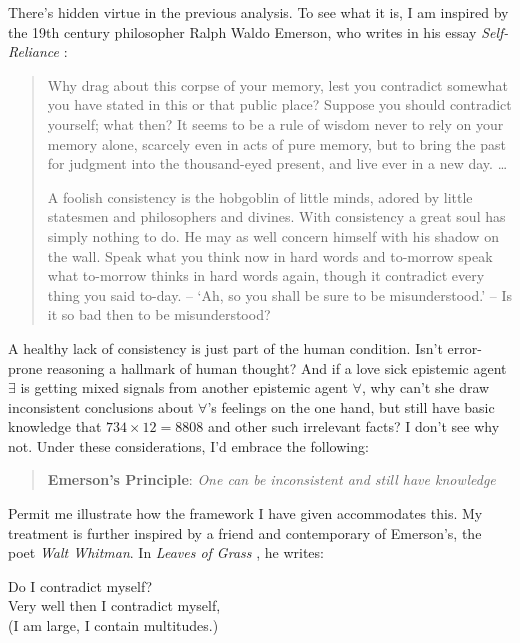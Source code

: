 \documentclass[11pt]{article}
\numberwithin{equation}{subsection}
\begin{document}
There's hidden virtue in the previous analysis.  To see what it is, I am inspired by the 19th century philosopher Ralph Waldo Emerson, who writes in his essay \emph{Self-Reliance} \citep{emerson_essays_2008}:
\begin{quote}
{ Why drag about this corpse of your memory, lest you contradict somewhat you have stated in this or that public place? Suppose you should contradict yourself; what then? It seems to be a rule of wisdom never to rely on your memory alone, scarcely even in acts of pure memory, but to bring the past for judgment into the thousand-eyed present, and live ever in a new day. \ldots}

{A foolish consistency is the hobgoblin of little minds, adored by little statesmen and philosophers and divines. With consistency a great soul has simply nothing to do. He may as well concern himself with his shadow on the wall. Speak what you think now in hard words and to-morrow speak what to-morrow thinks in hard words again, 
though it contradict every thing you said to-day. 
-- `Ah, so you shall be sure to be misunderstood.' -- Is it so bad then to be misunderstood?
}
\end{quote}

A healthy lack of consistency is just part of the human condition.  Isn't error-prone reasoning a hallmark of human thought?  And if a love sick epistemic agent $\exists$ is getting mixed signals from another epistemic agent $\forall$, why can't she draw inconsistent conclusions about $\forall$'s feelings on the one hand, but still have basic knowledge that $734\times 12 = 8808$ and other such irrelevant facts?  I don't see why not.  Under these considerations, I'd embrace the following:

\begin{quote}
 \textbf{Emerson's Principle}: \emph{One can be inconsistent and still have knowledge}
\end{quote}

Permit me illustrate how the framework I have given accommodates this. My treatment is further inspired by a friend and contemporary of Emerson's, the poet \emph{Walt Whitman}. In \emph{Leaves of Grass} \citep{whitman_leaves_2008}, he writes:
\begin{center}{  Do I contradict myself?\\
  Very well then I contradict myself,\\
  (I am large, I contain multitudes.)}
\end{center}
\end{document}
